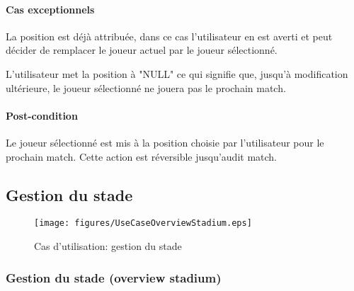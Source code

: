 \paragraph{Cas exceptionnels}
\begin{list}{}{\leftmargin=1.5em}
\item{La position est déjà attribuée, dans ce cas l'utilisateur en est averti et peut décider de remplacer le joueur actuel par le joueur sélectionné.}
\item{L'utilisateur met la position à "NULL" ce qui signifie que, jusqu'à modification ultérieure, le joueur sélectionné ne jouera pas le prochain match.}
\end{list}
\paragraph{Post-condition}
Le joueur sélectionné est mis à la position choisie par l'utilisateur pour le prochain match. Cette action est réversible jusqu'audit match.

%
%
%


\subsection{Gestion du stade}
\begin{figure}[h]
  \centering
  \texttt{[image: figures/UseCaseOverviewStadium.eps]}
  \caption{\label{fig:UC:stadiumManagement} Cas d'utilisation: gestion du stade}
\end{figure}

\subsubsection{Gestion du stade (overview stadium)}
\label{UC:stadiumView}
